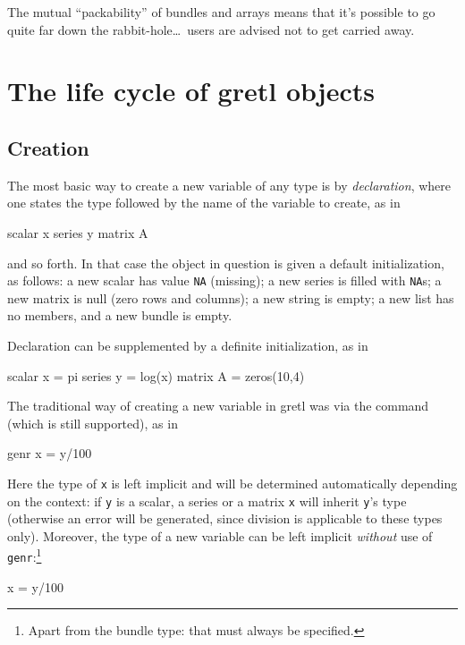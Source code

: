 The mutual ``packability'' of bundles and arrays means that it's
possible to go quite far down the rabbit-hole\dots\ users are advised
not to get carried away.

\section{The life cycle of gretl objects}

\subsection{Creation}

The most basic way to create a new variable of any type is by
\textit{declaration}, where one states the type followed by the name
of the variable to create, as in

\begin{code}
scalar x
series y
matrix A
\end{code}

and so forth. In that case the object in question is given a default
initialization, as follows: a new scalar has value \texttt{NA}
(missing); a new series is filled with \texttt{NA}s; a new matrix is
null (zero rows and columns); a new string is empty; a new list has no
members, and a new bundle is empty.

Declaration can be supplemented by a definite initialization, as in

\begin{code}
scalar x = pi
series y = log(x)
matrix A = zeros(10,4)
\end{code}

The traditional way of creating a new variable in gretl was via
the  command (which is still supported), as in

\begin{code}
genr x = y/100
\end{code}

Here the type of \texttt{x} is left implicit and will be determined
automatically depending on the context: if \texttt{y} is a scalar, a
series or a matrix \texttt{x} will inherit \texttt{y}'s type
(otherwise an error will be generated, since division is applicable to
these types only). Moreover, the type of a new variable can be left
implicit \textit{without} use of \texttt{genr}:\footnote{Apart from
  the bundle type: that must always be specified.}

\begin{code}
x = y/100
\end{code}

